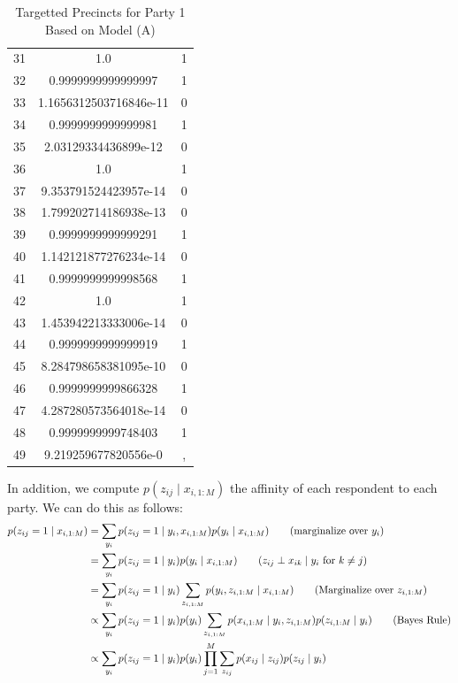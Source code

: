 \documentclass[12pt]{article}
\begin{document}
\begin{enumerate}[label=(\Alph*)]
\begin{enumerate}[label=(\roman*)]
\begin{table}
\begin{tabular}{ |c|c|c| }
						 31 &  1.0 & 1 \\
						 32 &  0.9999999999999997 & 1 \\
						 33 &  1.1656312503716846e-11 & 0 \\
						 34 &  0.9999999999999981 & 1 \\
						 35 &  2.03129334436899e-12 & 0 \\
						 36 &  1.0 & 1 \\
						 37 &  9.353791524423957e-14 & 0 \\
						 38 &  1.799202714186938e-13 & 0 \\
						 39 &  0.9999999999999291 & 1 \\
						 40 &  1.142121877276234e-14 & 0 \\
						 41 &  0.9999999999998568 & 1 \\
						 42 &  1.0 & 1 \\
						 43 &  1.453942213333006e-14 & 0 \\
						 44 &  0.9999999999999919 & 1 \\
						 45 &  8.284798658381095e-10 & 0 \\
						 46 &  0.9999999999866328 & 1 \\
						 47 &  4.287280573564018e-14 & 0 \\
						 48 &  0.9999999999748403 & 1 \\
						 49 &  9.219259677820556e-0 &,  \\
					 \hline
				\end{tabular}
  			\caption{Targetted Precincts for Party 1 Based on Model (A)}
  			\label{tab:targets_1}
  		\end{table}
  		In addition, we compute $p(z_{ij} \mid x_{i, 1:M})$ the affinity of each respondent to each party. We can do this as follows:
  		\begin{align*}
  			p(z_{ij} = 1 \mid x_{i, 1:M}) &= \sum_{y_i} p(z_{ij} = 1 \mid y_i, x_{i,1:M})p(y_i \mid x_{i, 1:M}) \tag{marginalize over $y_i$} \\
  			&= \sum_{y_i} p(z_{ij} = 1 \mid y_i)p(y_i \mid x_{i,1:M}) \tag{$z_{ij} \perp x_{ik} \mid y_i$ for $k \neq j$} \\
  			&= \sum_{y_i} p(z_{ij} = 1 \mid y_i) \sum_{z_{i,1:M}} p(y_i, z_{i, 1:M} \mid x_{i,1:M}) \tag{Marginalize over $z_{i,1:M}$} \\
  			&\propto  \sum_{y_i} p(z_{ij} = 1 \mid y_i)p(y_i) \sum_{z_{i, 1:M}} p(x_{i,1:M} \mid y_i, z_{i,1:M})p(z_{i, 1:M} \mid y_i) \tag{Bayes Rule} \\
  			&\propto \sum_{y_i} p(z_{ij} = 1 \mid y_i)p(y_i) \prod_{j=1}^M \sum_{z_{ij}} p(x_{ij} \mid z_{ij})p(z_{ij} \mid y_i)
  		\end{align*}



\end{enumerate}
\end{enumerate}
\end{document}
